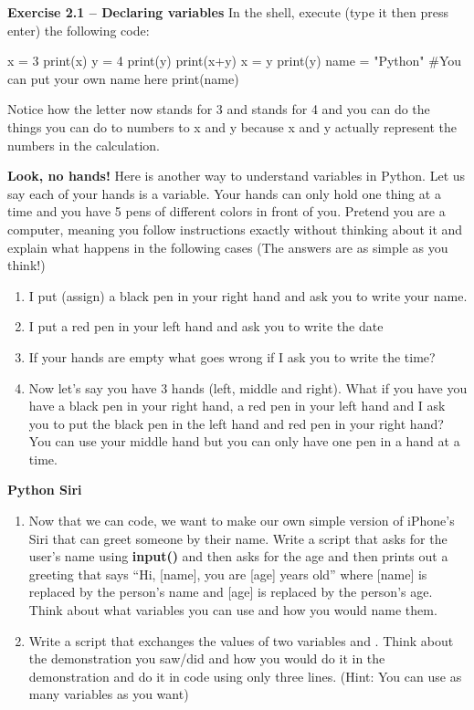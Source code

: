 \begin{exercise} \textbf{Exercise 2.1 – Declaring variables}
In the shell, execute (type it then press enter) the following code:
\begin{shell}
 x = 3
 print(x)
 y = 4
 print(y)
 print(x+y)
 x = y
 print(y)
 name = "Python"      #You can put your own name here
 print(name)
\end{shell}
	
Notice how the letter  now stands for 3 and  stands for 4 and you can do the things you can do to numbers to x and y because x and y actually represent the numbers in the calculation.
\end{exercise}

\begin{example}\label{example:hands} \textbf{Look, no hands!}
Here is another way to understand variables in Python. Let us say each of your hands is a variable. Your hands can only hold one thing at a time and you have 5 pens of different colors in front of you. Pretend you are a computer, meaning you follow instructions exactly without thinking about it and explain what happens in the following cases (The answers are as simple as you think!)
\begin{enumerate}[label=\alph*]
\item I put (assign) a black pen in your right hand and ask you to write your name.\\
\item I put a red pen in your left hand and ask you to write the date\\
\item If your hands are empty what goes wrong if I ask you to write the time?\\
\item Now let's say you have 3 hands (left, middle and right). What if you have you have a black pen in your right hand, a red pen in your left hand and I ask you to put the black pen in the left hand and red pen in your right hand? You can use your middle hand but you can only have one pen in a hand at a time.
\end{enumerate}
\end{example}

\begin{exercise} \textbf{Python Siri}
\begin{enumerate}[label=\alph*]
\item Now that we can code, we want to make our own  simple version of iPhone’s Siri that can greet someone by their name. Write a script that asks
for the user’s name using \textbf{input()} and then asks for the age and then prints out a greeting that says “Hi, [name], you are [age] years old” where [name] is replaced by the person’s name and [age] is replaced by the person’s age. Think about what variables you can use and how you would name them.
\item Write a script that exchanges the values of two variables  and . Think about the demonstration you saw/did and how you would do it in the demonstration and do it in code using only three
lines. (Hint: You can use as many variables as you want)
\end{enumerate}
\end{exercise}

